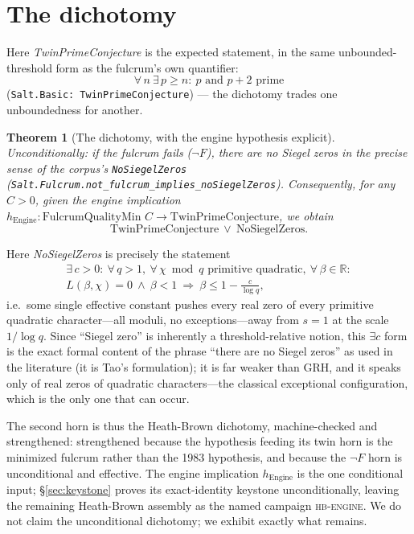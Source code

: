 \documentclass{CUP-JNL-FMP}
\newcommand{\leanname}[1]{\par\noindent{\small\texttt{#1}}}
\newcommand{\leaninline}[1]{{\small\texttt{#1}}}
\newtheorem{theorem}{Theorem}[section]
\theoremstyle{remark}
\begin{document}
\section{The dichotomy}\label{sec:dichotomy}

Here \emph{TwinPrimeConjecture} is the expected statement, in the same
unbounded-threshold form as the fulcrum's own quantifier:
\[
\forall\, n\ \exists\, p \ge n:\ p \text{ and } p+2 \text{ prime}
\]
(\leaninline{Salt.Basic: TwinPrimeConjecture}) --- the dichotomy trades
one unboundedness for another.

\begin{theorem}[The dichotomy, with the engine hypothesis
explicit]\label{thm:dich}
Unconditionally: if the fulcrum fails ($\lnot F$), there are no Siegel
zeros in the precise sense of the corpus's \leaninline{NoSiegelZeros}
(\leaninline{Salt.Fulcrum.not\_fulcrum\_implies\_noSiegelZeros}).
Consequently, for any $C > 0$, given the engine implication
$h_{\mathrm{Engine}} : \text{FulcrumQualityMin } C \to
\text{TwinPrimeConjecture}$, we obtain
\[
\text{TwinPrimeConjecture} \ \lor\ \text{NoSiegelZeros}.
\]
\leanname{Salt.Fulcrum.fulcrum\_dichotomy}
\end{theorem}

Here \emph{NoSiegelZeros} is precisely the statement
\begin{gather*}
\exists\, c > 0:\ \forall\, q > 1,\ \forall\, \chi \bmod q
\text{ primitive quadratic},\ \forall\, \beta \in \mathbb{R}:\\
L(\beta, \chi) = 0 \ \wedge\ \beta < 1
\ \Longrightarrow\ \beta \le 1 - \frac{c}{\log q},
\end{gather*}
i.e.\ some single effective constant pushes every real zero of every
primitive quadratic character---all moduli, no exceptions---away from
$s = 1$ at the scale $1/\log q$. Since ``Siegel zero'' is inherently a
threshold-relative notion, this $\exists c$ form is the exact formal
content of the phrase ``there are no Siegel zeros'' as used in the
literature (it is Tao's formulation); it is far weaker than GRH, and it
speaks only of real zeros of quadratic characters---the classical
exceptional configuration, which is the only one that can occur.

The second horn is thus the Heath-Brown dichotomy, machine-checked and
strengthened: strengthened because the hypothesis feeding its twin horn is
the minimized fulcrum rather than the 1983 hypothesis, and because the
$\lnot F$ horn is unconditional and effective. The engine implication
$h_{\mathrm{Engine}}$ is the one conditional input; \S\ref{sec:keystone}
proves its exact-identity keystone unconditionally, leaving the remaining
Heath-Brown assembly as the named campaign \textsc{hb-engine}. We do not
claim the unconditional dichotomy; we exhibit exactly what
remains.
\end{document}
